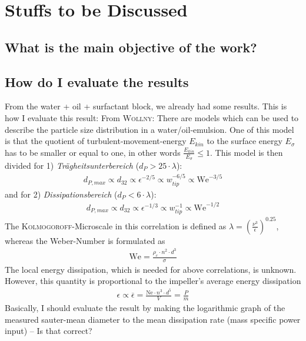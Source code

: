 \chapter{Stuffs to be Discussed}

\section{What is the main objective of the work?}

\section{How do I evaluate the results}
From the water + oil + surfactant block, we already had some results. This is how I evaluate this result: From \textsc{Wollny}: There are models which can be used to describe the particle size distribution in a water/oil-emulsion. One of this model is that the quotient of turbulent-movement-energy $E_{kin}$ to the surface energy $E_\sigma$ has to be smaller or equal to one, in other words $\frac{E_{kin}}{E_\sigma} \leqslant 1$. This model is then divided for 1) \textit{Tr\"agheitsunterbereich} ($d_P > 25 \cdot \lambda$):
\begin{align}
    d_{P, max} \propto d_{32} \propto \epsilon^{-2/5} \propto w_{tip}^{-6/5} \propto \text{We}^{-3/5}
\end{align}
and for 2) \textit{Dissipationsbereich} ($d_P < 6 \cdot \lambda$):
\begin{align}
    d_{P, max} \propto d_{32} \propto \epsilon^{-1/3} \propto w_{tip}^{-1} \propto \text{We}^{-1/2}
\end{align}
The \textsc{Kolmogoroff}-Microscale in this correlation is defined as $\lambda = \left( \frac{\nu^3}{\epsilon} \right)^{0.25}$, whereas the Weber-Number is formulated as
\begin{align}
    \text{We} = \frac{\rho_c \cdot n^2 \cdot d^3}{\sigma}
\end{align}
The local energy dissipation, which is needed for above correlations, is unknown. However, this quantity is proportional to the impeller's average energy dissipation
\begin{align}
    \epsilon \propto \overline{\epsilon} = \frac{\text{Ne} \cdot n^3 \cdot d^5}{V} = \frac{P}{m}
\end{align}
Basically, I should evaluate the result by making the logarithmic graph of the measured sauter-mean diameter to the mean dissipation rate (mass specific power input) -- Is that correct?

